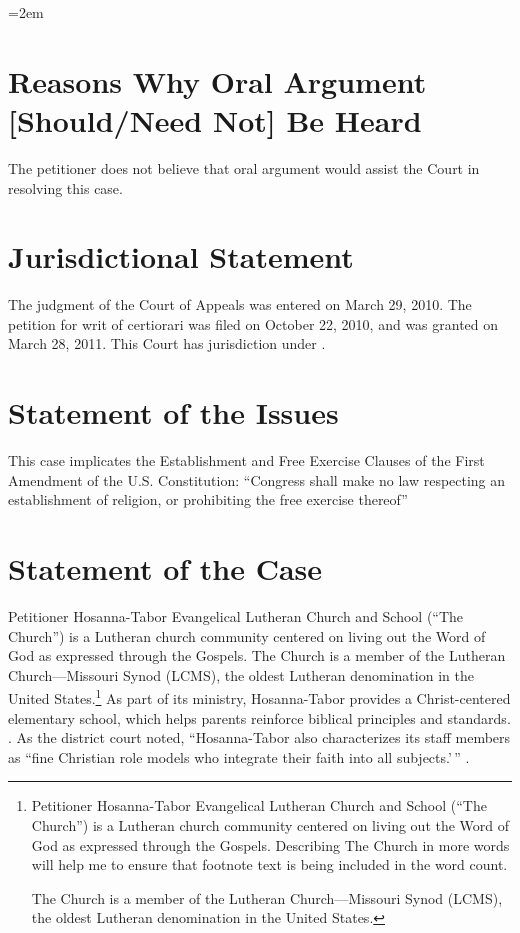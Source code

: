 \documentclass[12pt,\documentclassflag]{FRAP_Brief}
\author{Brendan Bernicker}
\def\HTDist#1{\pincite{Hosanna-Tabor I}{#1}}
\begin{document}
\makefrontmatter

\parindent=2em 
\setlength{\parskip}{1.25ex plus 2ex minus .5ex} 

\section{Reasons Why Oral Argument [Should/Need Not] Be Heard} %
The petitioner does not believe that oral argument would assist the Court in resolving this case.


\section{Jurisdictional Statement}
The judgment of the Court of Appeals was entered on March 29, 2010. The petition for writ of certiorari was filed on October 22, 2010, and was granted on March 28, 2011. This Court has jurisdiction under
.

\section{Statement of the Issues} 
This case implicates the Establishment and Free Exercise Clauses of the First Amendment of the U.S. Constitution\cite[!]{1stamend}: ``Congress shall make no law respecting an establishment of religion, or prohibiting the free exercise thereof\ldotss''


\section{Statement of the Case} 

Petitioner Hosanna-Tabor Evangelical Lutheran Church and School (``The Church'') is a Lutheran church community centered on living out the Word of God as expressed through the Gospels. The Church is a member of the Lutheran Church---Missouri Synod (LCMS), the oldest Lutheran denomination in the United States.\footnote{Petitioner Hosanna-Tabor Evangelical Lutheran Church and School (``The Church'') is a Lutheran church community centered on living out the Word of God as expressed through the Gospels. Describing The Church in more words will help me to ensure that footnote text is being included in the word count.\par The Church is a member of the Lutheran Church---Missouri Synod (LCMS), the oldest Lutheran denomination in the United States.} As part of its ministry, Hosanna-Tabor provides a Christ-centered elementary school, which helps parents reinforce biblical principles and standards. \See \HTDist{884}.  As the district court noted, ``Hosanna-Tabor also characterizes its staff members as ``fine Christian role models who integrate their faith into all subjects.'\,'' \HTDist{884}. 
\end{document}
